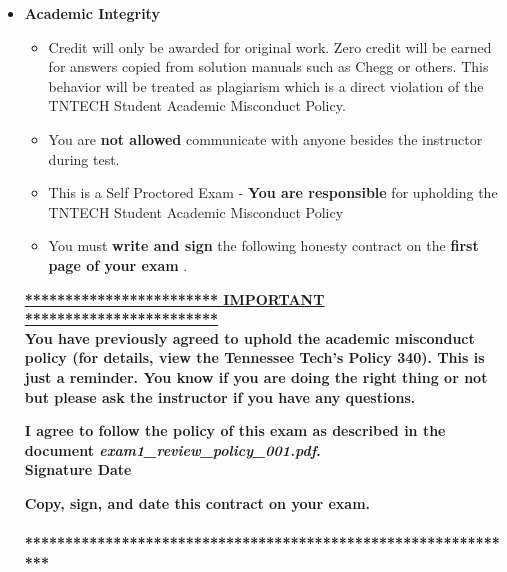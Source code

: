 \documentclass[11pt]{article}
\newcommand{\EXAMNUM}{1\hspace{0mm}}
\newcommand{\SECNUM}{001\hspace{0mm}}
\begin{document}
\begin{itemize}
\begin{itemize}
	\end{itemize}

\newpage
		\item  \textbf{ \Large Academic Integrity}
\begin{itemize}

		\item {\B Credit will only be awarded for original work. Zero credit will be earned for answers copied from solution manuals such as Chegg or others. This behavior will be treated as plagiarism which is a direct violation of the TNTECH Student Academic Misconduct Policy.}

		\item  You are {\bf not allowed} communicate with anyone besides the instructor during test. 
		\item This is a Self Proctored Exam - {\bf You are responsible} for upholding the TNTECH Student Academic Misconduct Policy
		\item  You must {\bf write and sign} the following honesty contract on the {\bf first page of your exam }. 
		
		

\end{itemize}


 {\R  \bf \underline{************************ IMPORTANT ************************}} \vspace{3mm}\\
			  {\R \bf You have previously agreed to uphold the academic misconduct policy (for details, view the
Tennessee Tech's Policy 340). This is just a reminder. You know if you are doing the right thing or not but please ask the instructor if you have any questions. }
\begin{framed}
	
	\vspace{3mm}	 \textbf{ I \underline{\hspace{50mm}} agree to follow the policy of this exam \vspc as described in the document {\it exam\EXAMNUM\_review\_policy\_\SECNUM.pdf}.  }\vspace{3mm}\\
		 \textbf{\Large Signature \underline{\hspace{80mm}} Date\underline{\hspace{20mm} }}\\

\end{framed}
			{\R  \bf Copy, sign, and date this contract on your exam. }   \vspace{1mm}\\
			{\R  \bf \underline{\hspace{140mm}}} \\
			{\R  \bf ***************************************************************} 


\end{itemize}
\end{document}
